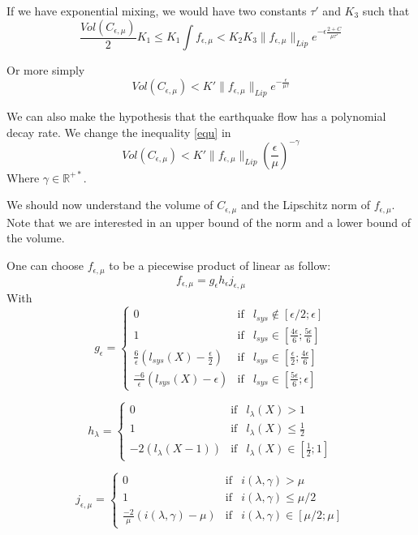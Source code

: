 If we have exponential mixing, we would have two constants $\tau'$ and $K_3$ such that \[
\frac{Vol(C_{\epsilon,\mu})}{2}K_1 \leq K_1 \int f_{\epsilon,\mu}
< K_2 K_3 \| f_{\epsilon,\mu} \|_{Lip} e^{-\epsilon \frac{2+C}{\mu \tau'}}
\]

Or more simply \begin{equation}
Vol(C_{\epsilon,\mu}) < K' \| f_{\epsilon,\mu} \|_{Lip} e^{-\frac{\epsilon}{\mu \tau}}
\label{equ}
\end{equation}


We can also make the hypothesis that the earthquake flow has a polynomial decay rate. We change the inequality \ref{equ} in
\begin{equation}
Vol(C_{\epsilon,\mu}) < K' \| f_{\epsilon,\mu} \|_{Lip} (\frac{\epsilon}{\mu})^{-\gamma}
\label{poly}
\end{equation}
Where $\gamma \in \mathbb{R^{+*}}$.

We should now understand the volume of $C_{\epsilon,\mu}$ and the Lipschitz norm of $f_{\epsilon,\mu}$. Note that we are interested in an upper bound of the norm and a lower bound of the volume.


One can choose $f_{\epsilon,\mu}$ to be a piecewise product of linear as follow:\[
f_{\epsilon,\mu}=g_{\epsilon}h_{\epsilon}j_{\epsilon,\mu}
\]
With
$$
g_{\epsilon} = \left \{
\begin{array}{lll}
0 & \text{if} & l_{sys} \notin [\epsilon/2;\epsilon]\\
1 & \text{if} & l_{sys} \in [\frac{4 \epsilon}{6};\frac{5 \epsilon}{6}]\\
\frac{6}{\epsilon}(l_{sys}(X)-\frac{\epsilon}{2}) & \text{if} & l_{sys} \in [\frac{\epsilon}{2};\frac{4 \epsilon}{6}]\\
\frac{-6}{\epsilon}(l_{sys}(X)-\epsilon) & \text{if} & l_{sys} \in [\frac{5 \epsilon}{6};\epsilon]
\end{array}
\right .
$$

$$
h_{\lambda} = \left \{
\begin{array}{lll}
0 & \text{if} & l_{\lambda}(X) > 1\\
1 & \text{if} & l_{\lambda}(X) \leq \frac{1}{2}\\
-2(l_\lambda(X -1)) & \text{if} & l_{\lambda}(X) \in [\frac{1}{2};1]
\end{array}
\right .
$$

$$
j_{\epsilon,\mu} = \left \{
\begin{array}{lll}
0 & \text{if} & i(\lambda,\gamma) > \mu\\
1 & \text{if} & i(\lambda,\gamma) \leq \mu/2\\
\frac{-2 }{\mu}(i(\lambda,\gamma)-\mu) & \text{if} & i(\lambda,\gamma) \in [\mu/2; \mu]
\end{array}
\right .
$$

